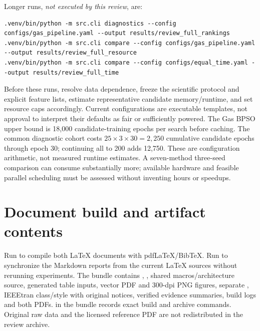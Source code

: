 \documentclass[11pt,a4paper]{report}
\begin{document}
Longer runs, \emph{not executed by this review}, are:
\begin{lstlisting}
.venv/bin/python -m src.cli diagnostics --config configs/gas_pipeline.yaml --output results/review_full_rankings
.venv/bin/python -m src.cli compare --config configs/gas_pipeline.yaml --output results/review_full_resource
.venv/bin/python -m src.cli compare --config configs/equal_time.yaml --output results/review_full_time
\end{lstlisting}
Before these runs, resolve data dependence, freeze the scientific protocol and explicit feature lists, estimate representative candidate memory/runtime, and set resource caps accordingly. Current configurations are executable templates, not approval to interpret their defaults as fair or sufficiently powered. The Gas BPSO upper bound is 18,000 candidate-training epochs per search before caching. The common diagnostic cohort costs $25\times3\times30=2,250$ cumulative candidate epochs through epoch 30; continuing all to 200 adds 12,750. These are configuration arithmetic, not measured runtime estimates. A seven-method three-seed comparison can consume substantially more; available hardware and feasible parallel scheduling must be assessed without inventing hours or speedups.

\section{Document build and artifact contents}
Run  to compile both LaTeX documents with pdfLaTeX/BibTeX. Run  to synchronize the Markdown reports from the current LaTeX sources without rerunning experiments. The bundle contains , , shared macros/architecture source, generated table inputs, vector PDF and 300-dpi PNG figures, separate , IEEEtran class/style with original notices, verified evidence summaries, build logs and both PDFs.  in the bundle records exact build and archive commands. Original raw data and the licensed reference PDF are not redistributed in the review archive.



\end{document}
